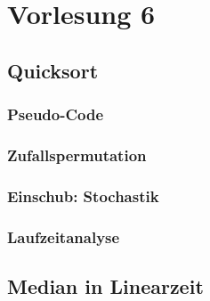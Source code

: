 \chapter{Vorlesung 6}

\section{Quicksort}

\subsection{Pseudo-Code}

\subsection{Zufallspermutation}

\subsection{Einschub: Stochastik}

\subsection{Laufzeitanalyse}


\section{Median in Linearzeit}